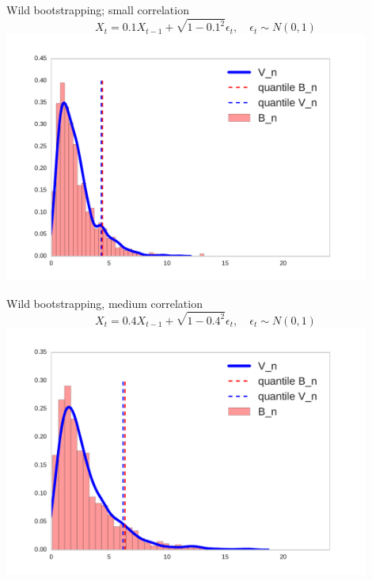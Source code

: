 \documentclass{beamer}
\begin{document}
 \begin{frame}{Wild bootstrapping; small correlation }
\centering
 $$X_t = 0.1 X_{t-1} + \sqrt{1 - 0.1^2}\epsilon_t, \quad \epsilon_t \sim N(0,1)$$
 \includegraphics[width=0.9\textwidth]{./img/bootstrapWorks1.pdf}

 \end{frame}

 \begin{frame}{Wild bootstrapping, medium correlation}
\centering
 $$X_t = 0.4 X_{t-1} + \sqrt{1 - 0.4^2}\epsilon_t, \quad \epsilon_t \sim N(0,1)$$
 \includegraphics[width=0.9\textwidth]{./img/bootstrapWorks4.pdf}
\end{frame}
\end{document}
